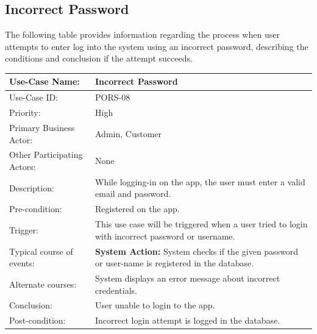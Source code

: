 \subsection{Incorrect Password}
The following table provides information regarding the process when user attempts to enter log into the system using an incorrect password, describing the conditions and conclusion if the attempt succeeds. 
\begin{center}
    \begin{tabular}{ @{}|p{5cm}||p{7cm}|  }
    \hline
    Use-Case Name: & Incorrect Password \\ \hline
    Use-Case ID: & PORS-08\\ \hline
    Priority: & High \\ \hline
    Primary Business Actor: & Admin, Customer \\ \hline
    Other Participating Actors: &  None \\ \hline
    Description: & While logging-in on the app, the user must enter a valid email and password.\\ \hline
    Pre-condition: & Registered on the app. \\ \hline
    Trigger: &  This use case will be triggered when a user tried to login with incorrect password or username. \\ \hline
    Typical course of events: & \textbf{System Action:} \newline System checks if the given password or user-name is registered in the database.  \\ \hline
    Alternate courses: & System displays an error message about incorrect credentials. \\ \hline
    Conclusion: & User unable to login to the app. \\ \hline
    Post-condition: & Incorrect login attempt is logged in the database. \\ \hline
    \end{tabular}
\end{center}


